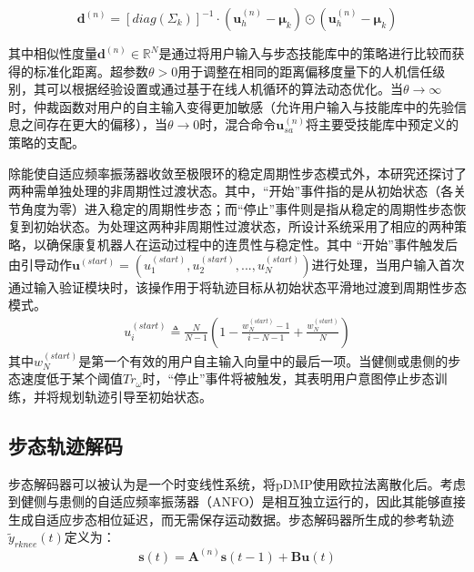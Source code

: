 \begin{equation}
  \label{deqn_ex17}
  {\pmb{d}^{(n)}} = {\left[ {diag({{\Sigma _k}})} \right]^{ - 1}} \cdot \left( {\pmb{u}_h^{(n)} - {\pmb{\mu }_k}} \right) \odot \left( {\pmb{u}_h^{(n)} - {\pmb{\mu }_k}} \right)
\end{equation}

其中相似性度量${\pmb{d}^{(n)}} \in {\mathbb{R}^N}$是通过将用户输入与步态技能库中的策略进行比较而获得的标准化距离。超参数$\theta>0$用于调整在相同的距离偏移度量下的人机信任级别，其可以根据经验设置或通过基于在线人机循环的算法动态优化。当$\theta \to \infty$时，仲裁函数对用户的自主输入变得更加敏感（允许用户输入与技能库中的先验信息之间存在更大的偏移），当$\theta \to 0$时，混合命令${\pmb{u}}_{sa}^{(n)}$将主要受技能库中预定义的策略的支配。

除能使自适应频率振荡器收敛至极限环的稳定周期性步态模式外，本研究还探讨了两种需单独处理的非周期性过渡状态。其中，``开始''事件指的是从初始状态（各关节角度为零）进入稳定的周期性步态；而``停止''事件则是指从稳定的周期性步态恢复到初始状态。为处理这两种非周期性过渡状态，所设计系统采用了相应的两种策略，以确保康复机器人在运动过程中的连贯性与稳定性。其中 ``开始''事件触发后由引导动作${\pmb{u}^{(start)}} = ({u}_1^{(start)},{u}_2^{(start)},...,{u}_N^{(start)})$进行处理，当用户输入首次通过输入验证模块时，该操作用于将轨迹目标从初始状态平滑地过渡到周期性步态模式。
\begin{equation}
  \label{deqn_ex18}
  \begin{array}{*{20}{c}}
    {{u}_i^{(start)} \triangleq \frac{N}{{N - 1}}\left( {1 - \frac{{w_N^{(start)} - 1}}{{i - N-1}} + \frac{{w_N^{(start)}}}{N}} \right)} 
  \end{array}
\end{equation} 
其中$w_N^{(start)}$是第一个有效的用户自主输入向量中的最后一项。当健侧或患侧的步态速度低于某个阈值$T{r_\omega }$时，“停止”事件将被触发，其表明用户意图停止步态训练，并将规划轨迹引导至初始状态。

\subsection{步态轨迹解码}步态解码器可以被认为是一个时变线性系统，将pDMP使用欧拉法离散化后。考虑到健侧与患侧的自适应频率振荡器（ANFO）是相互独立运行的，因此其能够直接生成自适应步态相位延迟，而无需保存运动数据。步态解码器所生成的参考轨迹${{\tilde y}_{rknee}}(t)$定义为：
\begin{equation}
  \label{deqn_ex19}
  \pmb{s}(t) = {{\mathbf{A}}^{(n)}}\pmb{s}(t - 1) + {\mathbf{B}}\pmb{u}(t)
\end{equation}

